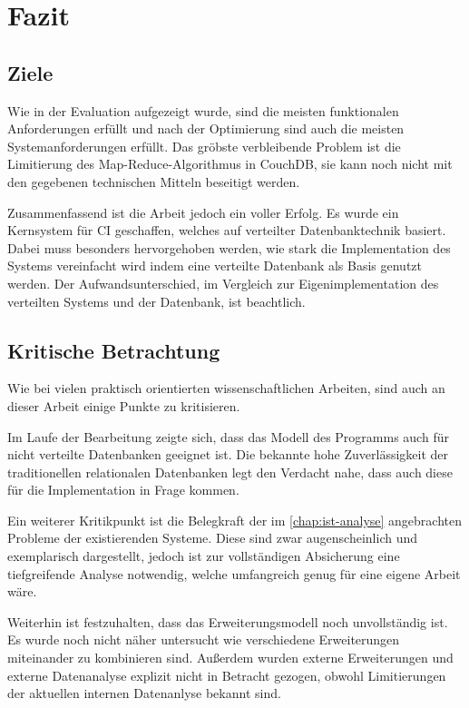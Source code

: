 \chapter{Fazit}
\label{cha:fazit}


\section{Ziele}
\label{sec:fazit:ziele}

Wie in der Evaluation aufgezeigt wurde, sind die meisten funktionalen Anforderungen erfüllt und nach der Optimierung sind auch die meisten Systemanforderungen erfüllt.
Das gröbste verbleibende Problem ist die Limitierung des Map-Reduce-Algorithmus in CouchDB,
sie kann noch nicht mit den gegebenen technischen Mitteln beseitigt werden.

Zusammenfassend ist die Arbeit jedoch ein voller Erfolg.
Es wurde ein Kernsystem für \ac{CI} geschaffen, welches auf verteilter Datenbanktechnik basiert.
Dabei muss besonders hervorgehoben werden, wie stark die Implementation des Systems vereinfacht wird
indem eine verteilte Datenbank als Basis genutzt werden. Der Aufwandsunterschied, im Vergleich zur Eigenimplementation des verteilten Systems und
der Datenbank, ist beachtlich.


\section{Kritische Betrachtung}
\label{sec:fazit:kritik}

Wie bei vielen praktisch orientierten wissenschaftlichen Arbeiten,
sind auch an dieser Arbeit einige Punkte zu kritisieren.

Im Laufe der Bearbeitung zeigte sich, dass das Modell des Programms auch für
nicht verteilte Datenbanken geeignet ist.
Die bekannte hohe Zuverlässigkeit der traditionellen relationalen Datenbanken legt den Verdacht nahe, dass auch diese für die Implementation in Frage kommen.

Ein weiterer Kritikpunkt ist die Belegkraft der im \cref{chap:ist-analyse} angebrachten Probleme der existierenden Systeme. Diese sind zwar augenscheinlich und exemplarisch dargestellt, jedoch ist zur vollständigen Absicherung eine tiefgreifende Analyse notwendig, welche umfangreich genug für eine eigene Arbeit wäre.

Weiterhin ist festzuhalten, dass das Erweiterungsmodell noch unvollständig ist.
Es wurde noch nicht näher untersucht wie verschiedene Erweiterungen miteinander zu kombinieren sind. Außerdem wurden externe Erweiterungen und externe Datenanalyse explizit nicht in Betracht gezogen, obwohl Limitierungen der aktuellen internen Datenanlyse bekannt sind.

